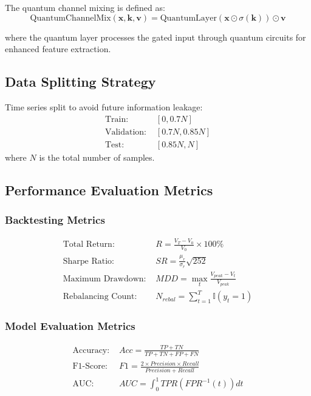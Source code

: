 \documentclass[12pt,a4paper]{article}
\begin{document}
The quantum channel mixing is defined as:
\begin{equation}
\text{QuantumChannelMix}(\mathbf{x}, \mathbf{k}, \mathbf{v}) = \text{QuantumLayer}(\mathbf{x} \odot \sigma(\mathbf{k})) \odot \mathbf{v}
\end{equation}

where the quantum layer processes the gated input through quantum circuits for enhanced feature extraction.

\subsection{Data Splitting Strategy}

Time series split to avoid future information leakage:
\begin{align}
\text{Train: } & [0, 0.7N] \\
\text{Validation: } & [0.7N, 0.85N] \\
\text{Test: } & [0.85N, N]
\end{align}
where $N$ is the total number of samples.

\subsection{Performance Evaluation Metrics}

\subsubsection{Backtesting Metrics}
\begin{align}
\text{Total Return: } & R = \frac{V_T - V_0}{V_0} \times 100\% \\
\text{Sharpe Ratio: } & SR = \frac{\mu_r}{\sigma_r} \sqrt{252} \\
\text{Maximum Drawdown: } & MDD = \max_{t} \frac{V_{peak} - V_t}{V_{peak}} \\
\text{Rebalancing Count: } & N_{rebal} = \sum_{t=1}^{T} \mathbb{I}(y_t = 1)
\end{align}

\subsubsection{Model Evaluation Metrics}
\begin{align}
\text{Accuracy: } & Acc = \frac{TP + TN}{TP + TN + FP + FN} \\
\text{F1-Score: } & F1 = \frac{2 \times Precision \times Recall}{Precision + Recall} \\
\text{AUC: } & AUC = \int_0^1 TPR(FPR^{-1}(t)) dt
\end{align}
\end{document}

